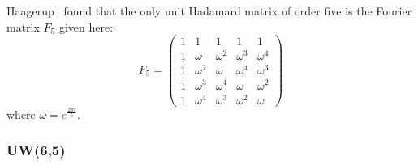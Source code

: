 Haagerup~\cite{H5} found that the only unit Hadamard matrix of order five is the Fourier matrix $F_5$ given here:
$$
F_{5} = \left(
\begin{array}{ccccc}
 1 & 1 &1 &1 &1 \\
 1 & \omega &\omega^2 &\omega^3 &\omega^4 \\
 1 & \omega^2 &\omega &\omega^4 &\omega^3 \\
 1 & \omega^3 &\omega^4 &\omega &\omega^2 \\
 1 & \omega^4 &\omega^3 &\omega^2 &\omega
\end{array}
\right)
$$ 
where $\omega = e^{\frac{2\pi i}{5}}$.

\subsubsection{UW(6,5)}

